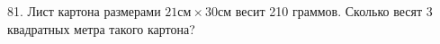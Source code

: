81. Лист картона размерами $21\text{см}\times30\text{см}$ весит 210 граммов. Сколько весят 3 квадратных метра такого картона?\\
